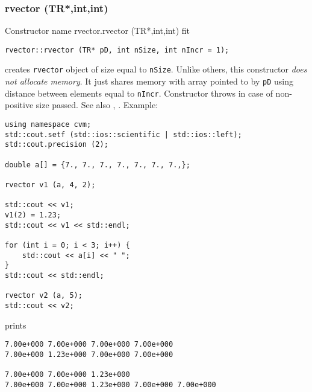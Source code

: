 \subsubsection{rvector (TR*,int,int)}
Constructor%
\pdfdest name {rvector.rvector (TR*,int,int)} fit
\begin{verbatim}
rvector::rvector (TR* pD, int nSize, int nIncr = 1);
\end{verbatim}
creates \verb"rvector" object of size equal to \verb"nSize".
Unlike others, this constructor \emph{does not allocate memory}.
It just shares memory with  array pointed to by \verb"pD" using
distance between elements equal to \verb"nIncr".
Constructor throws  
in case of non-positive size passed.
See also , .
Example:
\begin{Verbatim}
using namespace cvm;
std::cout.setf (std::ios::scientific | std::ios::left); 
std::cout.precision (2);

double a[] = {7., 7., 7., 7., 7., 7., 7.,};

rvector v1 (a, 4, 2);

std::cout << v1;
v1(2) = 1.23;
std::cout << v1 << std::endl;

for (int i = 0; i < 3; i++) {
    std::cout << a[i] << " ";
}
std::cout << std::endl;

rvector v2 (a, 5);
std::cout << v2;
\end{Verbatim}
prints
\begin{Verbatim}
7.00e+000 7.00e+000 7.00e+000 7.00e+000
7.00e+000 1.23e+000 7.00e+000 7.00e+000

7.00e+000 7.00e+000 1.23e+000
7.00e+000 7.00e+000 1.23e+000 7.00e+000 7.00e+000
\end{Verbatim}
\newpage



